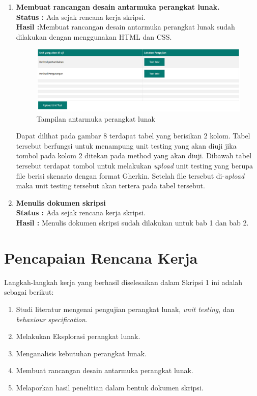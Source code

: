 \documentclass[a4paper,twoside]{article}
\begin{document}
\begin{enumerate}
		\item \textbf{Membuat rancangan desain antarmuka perangkat lunak.}\\
		{\bf Status :} Ada sejak rencana kerja skripsi.\\
		{\bf Hasil :}Membuat rancangan desain antarmuka perangkat lunak sudah dilakukan dengan menggunakan HTML dan CSS.
		\begin{figure}[h!]
			\includegraphics[scale=0.4]{../DokumenSkripsi/gambar/ui}
			\centering
			\caption{Tampilan antarmuka perangkat lunak}
		\end{figure}
		Dapat dilihat pada gambar 8 terdapat tabel yang berisikan 2 kolom. Tabel tersebut berfungsi untuk menampung unit testing yang akan diuji jika tombol pada kolom 2 ditekan pada method yang akan diuji. Dibawah tabel tersebut terdapat tombol untuk melakukan \textit{upload} unit testing yang berupa file berisi skenario dengan format Gherkin. Setelah file tersebut di-\textit{upload} maka unit testing tersebut akan tertera pada tabel tersebut.


		\item \textbf{Menulis dokumen skripsi}\\
		{\bf Status :} Ada sejak rencana kerja skripsi.\\
		{\bf Hasil :} Menulis dokumen skripsi sudah dilakukan untuk bab 1 dan bab 2.

	\end{enumerate}

\section{Pencapaian Rencana Kerja}
Langkah-langkah kerja yang berhasil diselesaikan dalam Skripsi 1 ini adalah sebagai berikut:
\begin{enumerate}
\item Studi literatur mengenai pengujian perangkat lunak, \textit{unit testing}, dan \textit{behaviour specification.}
\item Melakukan Eksplorasi perangkat lunak.
\item Menganalisis kebutuhan perangkat lunak.
\item Membuat rancangan desain antarmuka perangkat lunak.
\item Melaporkan hasil penelitian dalam bentuk dokumen skripsi.

\end{enumerate}
\end{document}
